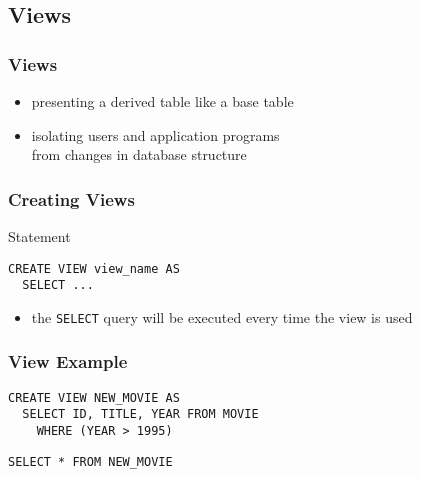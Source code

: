 \documentclass[dvipsnames]{beamer}
\theoremstyle{plain}
\begin{document}
\subsection{Views}

\begin{frame}
  \frametitle{Views}

  \begin{itemize}
    \item presenting a derived table like a base table

    \pause
    \item isolating users and application programs\\
      from changes in database structure
  \end{itemize}
\end{frame}

\begin{frame}[fragile]
  \frametitle{Creating Views}

  \begin{block}{Statement}
    \begin{lstlisting}[language=ExtendedSQL]
CREATE VIEW view_name AS
  SELECT ...
    \end{lstlisting}
  \end{block}

  \pause
  \begin{itemize}
    \item the \lstinline!SELECT! query will be executed every time the view is
      used
  \end{itemize}
\end{frame}

\begin{frame}[fragile]
  \frametitle{View Example}

  \begin{example}
    \begin{lstlisting}[language=ExtendedSQL]
CREATE VIEW NEW_MOVIE AS
  SELECT ID, TITLE, YEAR FROM MOVIE
    WHERE (YEAR > 1995)
    \end{lstlisting}

    \pause
    \begin{lstlisting}[language=ExtendedSQL]
SELECT * FROM NEW_MOVIE
    \end{lstlisting}
  \end{example}
\end{frame}
\end{document}
